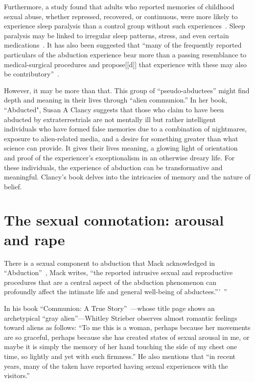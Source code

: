 Furthermore, a study found that adults who reported memories of childhood sexual abuse, whether repressed, recovered, or continuous,
were more likely to experience sleep paralysis than a control group without such experiences~\cite{McNally-Clancy}.
Sleep paralysis may be linked to irregular sleep patterns, stress,
and even certain medications~\cite{Sharpless_2016}.
It has also been suggested that ``many of the frequently reported particulars of the abduction experience
bear more than a passing resemblance to medical-surgical procedures
and propose[[d]] that experience with these may also be contributory''~\cite{Forrest_2008}.

However, it may be more than that. This group of ``pseudo-abductees'' might find depth and meaning in their lives through ``alien communion.'' In her book, ``Abducted"\cite{Clancy2007Apr}, Susan A Clancy suggests that those who claim to have been abducted by extraterrestrials are not mentally ill but rather intelligent individuals who have formed false memories due to a combination of nightmares, exposure to alien-related media, and a desire for something greater than what science can provide. It gives their lives meaning\cite{Frankl2006Jun}, a glowing light of orientation and proof of the experiencer's exceptionalism in an otherwise dreary life. For these individuals, the experience of abduction can be transformative and meaningful. Clancy's book delves into the intricacies of memory and the nature of belief.


\section{The sexual connotation: arousal and rape}
\label{2023-UFO-part-Perception-abductions-sexual}

There is a sexual component to abduction that Mack acknowledged in ``Abduction''~\cite{Mack1994Apr},
Mack writes, ``the reported intrusive sexual and reproductive procedures that are a central aspect
of the abduction phenomenon can profoundly affect the intimate life and general well-being of abductees.'''~''

In his book ``{C}ommunion: {A} True Story''~\cite{Strieber1987Jan}---whose title page shows an archetypical ``gray alien''---Whitley Strieber
observes almost romantic feelings toward aliens as follows: ``To me this is a woman, perhaps because her movements are so graceful,
perhaps because she has created states of sexual arousal in me, or maybe it is simply the memory of her hand touching the side of my chest one time,
so lightly and yet with such firmness.''
He also mentions that ``in recent years, many of the taken have reported having sexual experiences with the visitors.''

